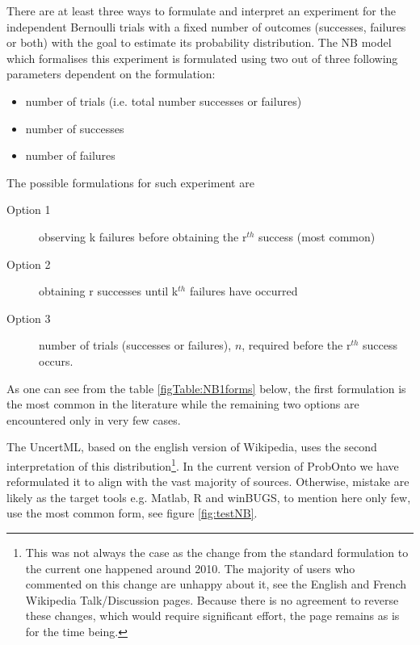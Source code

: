 There are at least three ways to formulate and interpret an experiment for 
the independent Bernoulli trials with a fixed number of outcomes (successes,
failures or both) with the goal to estimate its probability distribution. 
The NB model which formalises this experiment is formulated using two 
out of three following parameters dependent on the formulation: 
\begin{itemize}
\item 
number of trials (i.e. total number successes or failures) %
\item
number of successes %
\item
number of failures %
\end{itemize} 
The possible formulations for such experiment are 
\begin{description}
\item[Option 1]
observing k failures before obtaining the r$^{th}$ success (most common)
\item[Option 2]
obtaining r successes until k$^{th}$ failures have occurred
\item[Option 3]
number of trials (successes or failures), $n$, required before the r$^{th}$ success occurs.
\end{description}
As one can see from the table \ref{figTable:NB1forms} below, the first formulation
is the most common in the literature while the remaining two options are encountered 
only in very few cases.

The UncertML, based on the english version of Wikipedia, uses the second 
interpretation of this distribution\footnote{This was not always the case as the change 
from the standard formulation to the current one happened around 2010. The majority 
of users who commented on this change are unhappy about it, see the English and French 
Wikipedia Talk/Discussion pages. 
Because there is no agreement to reverse these changes, which would require 
significant effort, the page remains as is for the time being.}. In the current version 
of ProbOnto we have reformulated it to align with the vast majority of sources. 
Otherwise, mistake are likely as the target tools e.g. Matlab, R and 
winBUGS, to mention here only few, use the most common form, see figure 
\ref{fig:testNB}.

